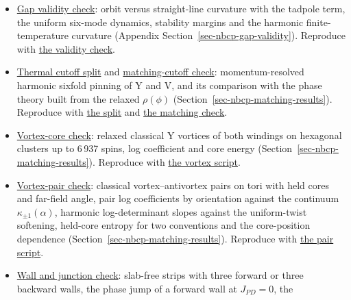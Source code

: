 \begin{itemize}
  mirror and the vacuum-energy identities \(v(\pi-\phi)=v(\phi)\) and
  \(v(\phi+2\pi/3)=v(\phi)\) on the Y and V orbits for mixed SOC, with
  the reflection about \(\phi=0\) as a control. Reproduce with
  \href{../../../examples/nbcp_c2t_reflection_check.py}{the reflection
  check}.
\item
  \href{../../../data-space/verification/261001-gap-validity/gap-validity-check.json}{Gap
  validity check}: orbit versus straight-line curvature with the
  tadpole term, the uniform six-mode dynamics, stability margins and the
  harmonic finite-temperature curvature (Appendix
  Section~\ref{sec-nbcp-gap-validity}). Reproduce with
  \href{../../../examples/nbcp_gap_validity_check.py}{the validity
  check}.
\item
  \href{../../../data-space/verification/261001-angular-thermal-split/angular-thermal-split.json}{Thermal
  cutoff split} and
  \href{../../../data-space/verification/261002-matching-cutoff/matching-cutoff-check.json}{matching-cutoff
  check}: momentum-resolved harmonic sixfold pinning of Y and V, and its
  comparison with the phase theory built from the relaxed
  \(\rho(\phi)\) (Section~\ref{sec-nbcp-matching-results}). Reproduce
  with \href{../../../examples/nbcp_angular_thermal_split.py}{the split}
  and \href{../../../examples/nbcp_matching_cutoff_check.py}{the
  matching check}.
\item
  \href{../../../data-space/verification/261002-y-vortex-core/vortex-core-check.json}{Vortex-core
  check}: relaxed classical Y vortices of both windings on hexagonal
  clusters up to 6\,937 spins, log coefficient and core energy
  (Section~\ref{sec-nbcp-matching-results}). Reproduce with
  \href{../../../examples/nbcp_y_vortex_core.py}{the vortex script}.
\item
  \href{../../../data-space/verification/261002-y-vortex-pair/vortex-pair-check.json}{Vortex-pair
  check}: classical vortex--antivortex pairs on tori with held cores and
  far-field angle, pair log coefficients by orientation against the
  continuum \(\kappa_{\pm1}(\alpha)\), harmonic log-determinant
  slopes against the uniform-twist softening, held-core entropy for two
  conventions and the core-position dependence
  (Section~\ref{sec-nbcp-matching-results}). Reproduce with
  \href{../../../examples/nbcp_y_vortex_pair.py}{the pair script}.
\item
  \href{../../../data-space/verification/261003-y-wall-junction/wall-junction-check.json}{Wall
  and junction check}: slab-free strips with three forward or three
  backward walls, the phase jump of a forward wall at \(J_{PD}=0\), the

\end{itemize}
